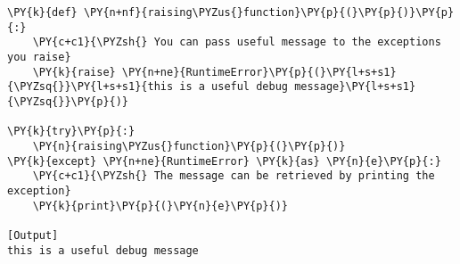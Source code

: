 \begin{Verbatim}[label=\makebox{\url{https://github.com/lucabaldini/cmepda/tree/master/slides/latex/snippets/raising.py}},commandchars=\\\{\}]
\PY{k}{def} \PY{n+nf}{raising\PYZus{}function}\PY{p}{(}\PY{p}{)}\PY{p}{:}
    \PY{c+c1}{\PYZsh{} You can pass useful message to the exceptions you raise}
    \PY{k}{raise} \PY{n+ne}{RuntimeError}\PY{p}{(}\PY{l+s+s1}{\PYZsq{}}\PY{l+s+s1}{this is a useful debug message}\PY{l+s+s1}{\PYZsq{}}\PY{p}{)} 

\PY{k}{try}\PY{p}{:}
    \PY{n}{raising\PYZus{}function}\PY{p}{(}\PY{p}{)}
\PY{k}{except} \PY{n+ne}{RuntimeError} \PY{k}{as} \PY{n}{e}\PY{p}{:}
    \PY{c+c1}{\PYZsh{} The message can be retrieved by printing the exception}
    \PY{k}{print}\PY{p}{(}\PY{n}{e}\PY{p}{)}

[Output]
this is a useful debug message
\end{Verbatim}